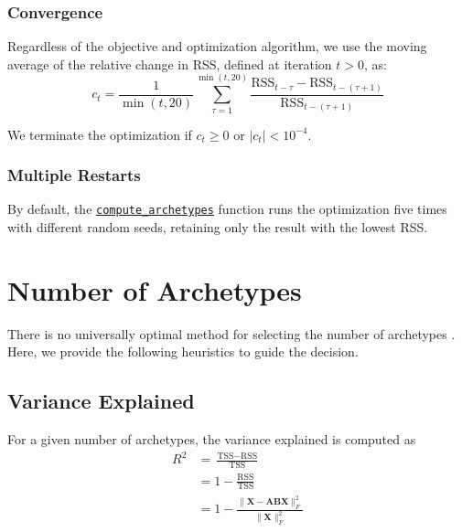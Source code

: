 \documentclass[oneside]{article}
\begin{document}
\subsubsection{Convergence}

Regardless of the objective and optimization algorithm, we use the moving average of the relative change in RSS, defined at iteration $t > 0$, as:
\begin{equation}
    c_t = \frac{1}{\min(t, 20)} \sum_{\tau = 1}^{\min(t, 20)} \frac{\text{RSS}_{t-\tau} - \text{RSS}_{t-(\tau+1)}}{\text{RSS}_{t-(\tau+1)}}
\end{equation}

We terminate the optimization if $c_t \geq 0$ or $|c_t| < 10^{-4}$.

\subsubsection{Multiple Restarts}

By default, the \href{https://github.com/saezlab/ParTIpy/blob/f0e2c9df82ba9ef18322ac9d97c085c14019bdf7/partipy/paretoti.py#L556-L716}{\texttt{compute\_archetypes}} function runs the optimization five times with different random seeds, retaining only the result with the lowest RSS.



\section{Number of Archetypes}

There is no universally optimal method for selecting the number of archetypes \autocite{alcacerSurveyArchetypalAnalysis2025}. Here, we provide the following heuristics to guide the decision.

\subsection{Variance Explained}

For a given number of archetypes, the variance explained is computed as
\begin{equation}
    \begin{aligned}
        R^2
        &= \frac{\text{TSS} - \text{RSS}}{\text{TSS}} \\
        &= 1 - \frac{\text{RSS}}{\text{TSS}} \\
        &= 1 - \frac{\| \mathbf{X} - \mathbf{A} \mathbf{B} \mathbf{X} \|_F^2}{\| \mathbf{X} \|_F^2}
    \end{aligned}
\end{equation}
\end{document}

